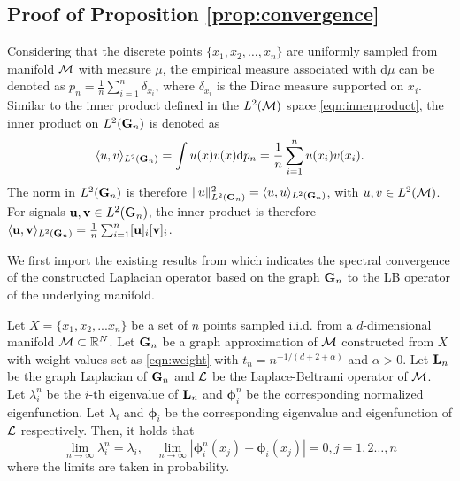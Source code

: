  \subsection{Proof of Proposition \ref{prop:convergence}}
 \label{app:convergence}
 Considering that the discrete points $\{x_1,x_2,\hdots,x_n\}$ are uniformly sampled from manifold ${\mathcal M}$ with measure $\mu$, the empirical measure associated with $\text{d}\mu$ can be denoted as $p_n=\frac{1}{n}\sum_{i=1}^n \delta_{x_i}$, where $\delta_{x_i}$ is the Dirac measure supported on $x_i$. Similar to the inner product defined in the $L^2({\mathcal M})$ space \eqref{eqn:innerproduct}, the inner product on $L^2({\mathbf G}_n)$ is denoted as
 \begin{equation}
     \langle u, v\rangle_{L^2({\mathbf G}_n)}=\int u(x)v(x)\text{d}p_n=\frac{1}{n}\sum_{i=1}^n u(x_i)v(x_i).
 \end{equation}
 The norm in $L^2({\mathbf G}_n)$ is therefore $\|u\|^2_{L^2({\mathbf G}_n)} = \langle u, u \rangle_{L^2({\mathbf G}_n)}$, with $u,v \in L^2({\mathcal M})$. For signals ${\mathbf u},{\mathbf v} \in L^2({\mathbf G}_n)$, the inner product is therefore $\langle {\ensuremath{\mathbf u}},{\mathbf v} \rangle_{L^2({\mathbf G}_n)} = \frac{1}{n}\sum_{i=1}^n [{\mathbf u}]_i[{\mathbf v}]_i$.
 
 We first import the existing results from \cite{belkin2006convergence} which indicates the spectral convergence of the constructed Laplacian operator based on the graph ${\mathbf G}_n$ to the LB operator of the underlying manifold.
 \begin{theorem}
 \label{thm:convergence}
 Let $X=\{x_1, x_2,...x_n\}$ be a set of $n$ points sampled i.i.d. from a $d$-dimensional manifold ${\mathcal M} \subset {\mathbb R}^N$. %
 Let ${\mathbf G}_n$ be a graph approximation of ${\mathcal M}$ constructed from $X$ with weight values set as \eqref{eqn:weight} with $t_n = n^{-1/(d+2+\alpha)}$ and $\alpha>0$. Let ${\mathbf L}_n$ be the graph Laplacian of ${\mathbf G}_n$ and ${\mathcal L}$ be the Laplace-Beltrami operator of ${\mathcal M}$. Let $\lambda_{i}^n$ be the $i$-th eigenvalue of ${\mathbf L}_n$ and $\bm\phi_{i}^n$ be the corresponding normalized eigenfunction. Let $\lambda_i$ and $\bm\phi_i$ be the corresponding eigenvalue and eigenfunction of ${\mathcal L}$ respectively. Then, it holds that
\begin{equation}
\label{eqn:convergence_spectrum}
    \lim_{n\rightarrow \infty } \lambda_i^n = \lambda_i, \quad \lim_{n\rightarrow \infty} |\bm\phi^{n}_i(x_j) -  \bm\phi_i(x_j)|=0, j=1,2 \hdots,n
\end{equation}
where the limits are taken in probability.
 \end{theorem}
 

